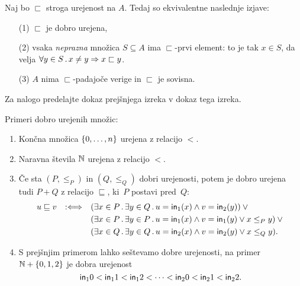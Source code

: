 \begin{izrek}
  \label{izr:dobra-urejenost-karakterizacija}
  Naj bo $\sqsubset$ stroga urejenost na $A$. Tedaj so ekvivalentne naslednje izjave:
  \begin{enumerate}
  \item[(1)] $\sqsubset$ je dobro urejena,
  \item[(2)] vsaka \emph{neprazna} množica $S \subseteq A$ ima $\sqsubset$-prvi element: to je tak $x \in S$, da velja
    $\forall y \in S \,.\, x \neq y \Rightarrow x \sqsubset y$.
  \item[(3)] $A$ nima $\sqsubset$-padajoče verige in $\sqsubset$ je sovisna.
  \end{enumerate}
\end{izrek}

\begin{dokaz}
  Za nalogo predelajte dokaz prejšnjega izreka v dokaz tega izreka.
\end{dokaz}

\begin{zgled}
  Primeri dobro urejenih množic:
  \begin{enumerate}
  \item Končna množica $\left\{0, \ldots, n\right\}$ urejena z relacijo $<$.

  \item Naravna števila $\mathbb{N}$ urejena z relacijo $<$.

  \item Če sta $(P, \leq_P)$ in $(Q, \leq_Q)$ dobri urejenosti, potem je dobro urejena tudi $P + Q$ z relacijo
    $\sqsubseteq$, ki~$P$ postavi pred~$Q$:
    \begin{equation*}
      u \sqsubseteq v \quad {{:}{\Longleftrightarrow}}\quad
      \begin{aligned}[t]
        &(\exists x \in P \,.\, \exists y \in Q \,.\, u = \mathsf{in}_{1}(x) \land v = \mathsf{in}_{2}(y)) \lor {}\\
        &(\exists x \in P \,.\, \exists y \in P \,.\, u = \mathsf{in}_{1}(x) \land v = \mathsf{in}_{1}(y) \lor x \leq_P y) \lor {}\\
        &(\exists x \in Q \,.\, \exists y \in Q \,.\, u = \mathsf{in}_{2}(x) \land v = \mathsf{in}_{2}(y) \lor x \leq_Q y).
      \end{aligned}
    \end{equation*}

  \item
    S prejšnjim primerom lahko seštevamo dobre urejenosti, na primer $\mathbb{N} + \left\{0, 1, 2\right\}$ je dobra
    urejenost
    \begin{equation*}
      \mathsf{in}_{1}{0} < \mathsf{in}_{1}{1} < \mathsf{in}_{1}{2} < \cdots < \mathsf{in}_{2}{0} < \mathsf{in}_{2}{1} < \mathsf{in}_{2}{2}.
    \end{equation*}
  \end{enumerate}
\end{zgled}

